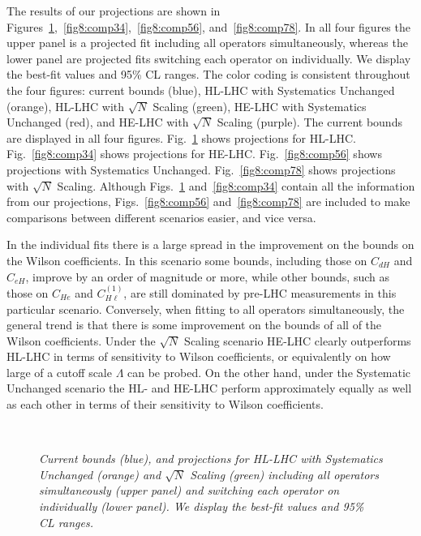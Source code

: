 \documentclass[../report.tex]{subfiles}
\providecommand{\main}{..}
\begin{document}
The results of our projections are shown in Figures~\ref{fig8:comp12},~\ref{fig8:comp34},~\ref{fig8:comp56}, and~\ref{fig8:comp78}.
In all four figures the upper panel is a projected fit including all operators simultaneously, whereas the lower panel are projected fits switching each operator on individually.
We display the best-fit values and 95\% CL ranges.
The color coding is consistent throughout the four figures: current bounds (blue), HL-LHC with Systematics Unchanged (orange), HL-LHC with $\sqrt{N}$ Scaling (green), HE-LHC with Systematics Unchanged (red), and HE-LHC with $\sqrt{N}$ Scaling (purple).
The current bounds are displayed in all four figures.
Fig.~\ref{fig8:comp12} shows projections for HL-LHC.
Fig.~\ref{fig8:comp34} shows projections for HE-LHC.
Fig.~\ref{fig8:comp56} shows projections with Systematics Unchanged.
Fig.~\ref{fig8:comp78} shows projections with $\sqrt{N}$ Scaling.
Although Figs.~\ref{fig8:comp12} and~\ref{fig8:comp34} contain all the information from our projections, Figs.~\ref{fig8:comp56} and~\ref{fig8:comp78} are included to make comparisons between different scenarios easier, and vice versa.

In the individual fits there is a large spread in the improvement on the bounds on the Wilson coefficients.
In this scenario some bounds, including those on $C_{dH}$ and $C_{eH}$, improve by an order of magnitude or more, while other bounds, such as those on $C_{He}$ and $C_{H\ell}^{(1)}$, are still dominated by pre-LHC measurements in this particular scenario.
Conversely, when fitting to all operators simultaneously, the general trend is that there is some improvement on the bounds of all of the Wilson coefficients.
Under the $\sqrt{N}$ Scaling scenario HE-LHC clearly outperforms HL-LHC in terms of sensitivity to Wilson coefficients, or equivalently on how large of a cutoff scale $\Lambda$ can be probed.
On the other hand, under the Systematic Unchanged scenario the HL- and HE-LHC perform approximately equally as well as each other in terms of their sensitivity to Wilson coefficients.

\begin{figure}
  \centering
    \\
 \caption{\it Current bounds (blue), and projections for HL-LHC with Systematics Unchanged (orange) and $\sqrt{N}$ Scaling (green) including all operators simultaneously (upper panel) and switching each operator on individually (lower panel). We display the best-fit values and 95\% CL ranges.}
   \label{fig8:comp12}
\end{figure} 
\end{document}
